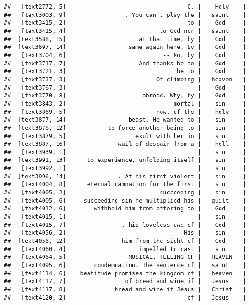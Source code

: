 \documentclass[]{article}
\begin{document}
\begin{verbatim}
##   [text2772, 5]                                -- O, |    Holy    |
##   [text3003, 9]                 . You can't play the |   saint    |
##   [text3415, 2]                                   to |    God     |
##   [text3415, 4]                           to God nor |   saint    |
##  [text3588, 15]                     at that time, by |    God     |
##  [text3697, 14]                  same again here. By |    God     |
##   [text3704, 6]                            -- No, by |    God     |
##   [text3717, 7]                   - And thanks be to |    God     |
##   [text3721, 3]                                be to |    God     |
##   [text3737, 3]                          Of climbing |   heaven   |
##   [text3767, 3]                                   -- |    God     |
##   [text3770, 8]                      abroad. Why, by |    God     |
##   [text3843, 2]                               mortal |    sin     |
##   [text3869, 5]                          now, of the |    holy    |
##  [text3877, 14]                  beast. He wanted to |    sin     |
##  [text3878, 12]            to force another being to |    sin     |
##   [text3879, 5]                    exult with her in |    sin     |
##  [text3887, 16]               wail of despair from a |    hell    |
##   [text3939, 1]                                      |    sin     |
##  [text3991, 13]      to experience, unfolding itself |    sin     |
##   [text3992, 1]                                      |    sin     |
##  [text3996, 14]               . At his first violent |    sin     |
##   [text4004, 8]      eternal damnation for the first |    sin     |
##   [text4005, 2]                           succeeding |    sin     |
##   [text4005, 6]     succeeding sin he multiplied his |   guilt    |
##   [text4012, 6]        withheld him from offering to |    God     |
##   [text4015, 1]                                      |    sin     |
##   [text4015, 7]                , his loveless awe of |    God     |
##   [text4056, 2]                                  His |    sin     |
##  [text4056, 12]                him from the sight of |    God     |
##   [text4060, 4]                     impelled to cast |    sin     |
##   [text4064, 5]                  MUSICAL, TELLING OF |   HEAVEN   |
##   [text4095, 6]        condemnation. The sentence of |   saint    |
##   [text4114, 6]    beatitude promises the kingdom of |   heaven   |
##   [text4117, 7]                 of bread and wine if |   Jesus    |
##   [text4117, 8]              bread and wine if Jesus |   Christ   |
##   [text4120, 2]                                   of |   Jesus    |

\end{verbatim}
\end{document}
